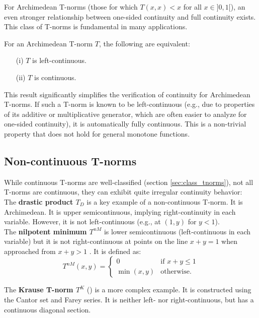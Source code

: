 For Archimedean T-norms (those for which $T(x,x) < x$ for all $x \in ]0,1[$), an even stronger relationship between one-sided continuity and full continuity exists. This class of T-norms is fundamental in many applications.
\begin{proposition}
  For an Archimedean T-norm $T$, the following are equivalent:
  \begin{enumerate}
      \item[(i)] $T$ is left-continuous.
      \item[(ii)] $T$ is continuous.
  \end{enumerate}
\end{proposition}
This result significantly simplifies the verification of continuity for Archimedean T-norms. If such a T-norm is known to be left-continuous (e.g., due to properties of its additive or multiplicative generator, which are often easier to analyze for one-sided continuity), it is automatically fully continuous. This is a non-trivial property that does not hold for general monotone functions.

\subsection{Non-continuous T-norms}

While continuous T-norms are well-classified (section \ref{sec:class_tnorms}), not all T-norms are continuous, they can exhibit quite irregular continuity behavior:\\

The \textbf{drastic product $T_D$} is a key example of a non-continuous T-norm. It is Archimedean. It is upper semicontinuous, implying right-continuity in each variable. However, it is not left-continuous (e.g., at $(1,y)$ for $y<1$).\\

The \textbf{nilpotent minimum $T^{nM}$} is lower semicontinuous (left-continuous in each variable) but it is not right-continuous at points on the line $x+y=1$ when approached from $x+y>1$ \cite[Rem.~1.21(i)]{Klement2000}. It is defined as:
  \[
  T^{nM}(x,y) =
  \begin{cases}
    0 & \text{if } x+y \leq 1 \\
    \min(x,y) & \text{otherwise.}
  \end{cases}
  \]


The \textbf{Krause T-norm $T^K$} (\cite[App.~B.1]{Klement2000}) is a more complex example. It is constructed using the Cantor set and Farey series. It is neither left- nor right-continuous, but has a continuous diagonal section.

